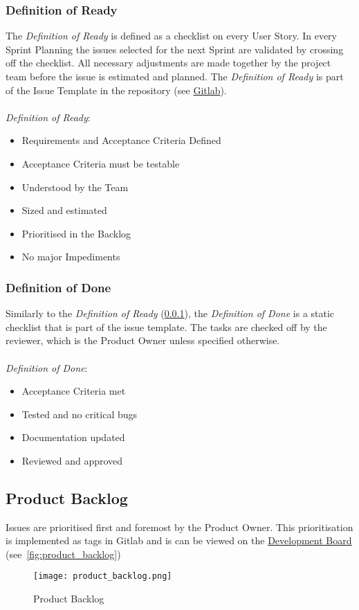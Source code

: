 \subsubsection{Definition of Ready}\label{subsubsec:dor}
The \textit{Definition of Ready} is defined as a checklist on every User Story.
In every Sprint Planning the issues selected for
the next Sprint are validated by crossing off the checklist.
All necessary adjustments are made together by the project team before the issue is
estimated and planned.
The \textit{Definition of Ready} is part of the Issue Template in the repository
(see \href{https://gitlab.ti.bfh.ch/decibel-threshold-event-displayer/decibel-threshold-event-displayer/-/blob/main/.gitlab/issue_templates/User\%20Story.md}{Gitlab}). \\ \\
\textit{Definition of Ready}:
\begin{itemize}
    \item Requirements and Acceptance Criteria Defined
    \item Acceptance Criteria must be testable
    \item Understood by the Team
    \item Sized and estimated
    \item Prioritised in the Backlog
    \item No major Impediments
\end{itemize}
\subsubsection{Definition of Done}\label{subsubsec:dod}
Similarly to the \textit{Definition of Ready} (\ref{subsubsec:dor}), the \textit{Definition of Done} is a static checklist that is part of
the issue template.
The tasks are checked off by the reviewer, which is the Product Owner unless specified otherwise. \\ \\
\textit{Definition of Done}:
\begin{itemize}
    \item Acceptance Criteria met
    \item Tested and no critical bugs
    \item Documentation updated
    \item Reviewed and approved
\end{itemize}
\subsection{Product Backlog}\label{subsec:product_backlog}
Issues are prioritised first and foremost by the Product Owner.
This prioritisation is implemented as tags in Gitlab and is can be viewed
on the \href{https://gitlab.ti.bfh.ch/decibel-threshold-event-displayer/decibel-threshold-event-displayer/-/boards/2832}{Development Board} (see\ \autoref{fig:product_backlog})
\begin{figure}[H]
    \centering
    \texttt{[image: product\_backlog.png]}
    \caption{Product Backlog}\label{fig:product_backlog}
\end{figure}
